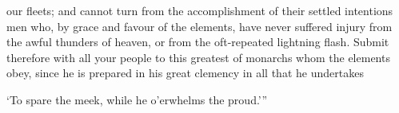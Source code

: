\documentclass[10pt]{book}
\begin{document}
\vspace{-2\parskip}
\vspace{-3\lineskip}
our fleets; and cannot turn from the accomplishment of their settled intentions men who, by grace and favour of the elements, have never suffered injury from the awful thunders of heaven, or from the oft-repeated lightning flash. Submit therefore with all your people to this greatest of monarchs whom the elements obey, since he is prepared in his great clemency in all that he undertakes 
\vspace{-.4cm}
\begin{center}
\parbox{.8\textwidth}{
`To spare the meek, while he o'erwhelms the proud.'\hspace{1pt}''
}
\end{center}

\begin{paracol}{2}


\end{paracol}
\end{document}
